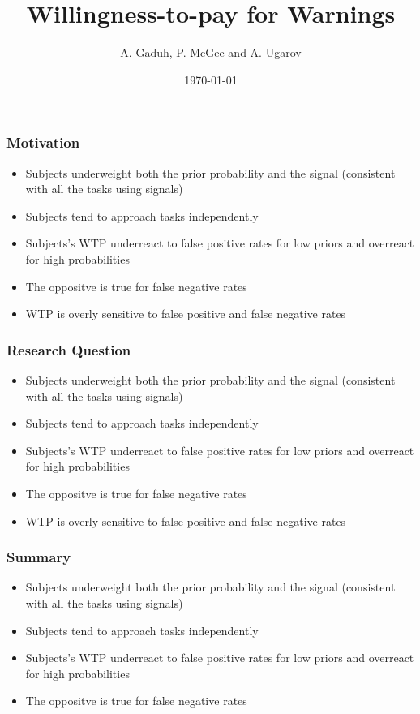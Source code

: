 \documentclass[11pt,hyperref={bookmarks=false}]{beamer}
\title[Willingness-to-pay for Warnings]{Willingness-to-pay for Warnings}
\author[A. Gaduh, P. McGee and A. Ugarov]{A. Gaduh, P. McGee and A. Ugarov}
\institute[]{}
\date{\today}
\begin{document}

\begin{frame}
\titlepage
\end{frame}




\begin{frame}
\frametitle{Motivation}
\begin{itemize}
\item Subjects underweight both the prior probability and the signal (consistent with all the tasks using signals)
\item Subjects tend to approach tasks independently
\item Subjects's WTP underreact to false positive rates for low priors and overreact for high probabilities
\item The oppositve is true for false negative rates
\item WTP is overly sensitive to false positive and false negative rates
\end{itemize}
\end{frame}



\begin{frame}
\frametitle{Research Question}
\begin{itemize}
\item Subjects underweight both the prior probability and the signal (consistent with all the tasks using signals)
\item Subjects tend to approach tasks independently
\item Subjects's WTP underreact to false positive rates for low priors and overreact for high probabilities
\item The oppositve is true for false negative rates
\item WTP is overly sensitive to false positive and false negative rates
\end{itemize}
\end{frame}



\begin{frame}
\frametitle{Summary}
\begin{itemize}
\item Subjects underweight both the prior probability and the signal (consistent with all the tasks using signals)
\item Subjects tend to approach tasks independently
\item Subjects's WTP underreact to false positive rates for low priors and overreact for high probabilities
\item The oppositve is true for false negative rates
\end{itemize}
\end{frame}
\end{document}
